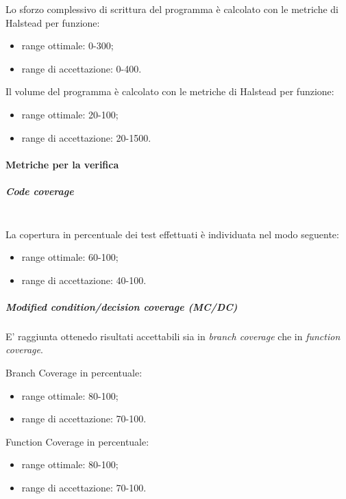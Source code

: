 Lo sforzo complessivo di scrittura del programma è calcolato con le metriche di Halstead per funzione:
\begin{itemize}
	\item range ottimale: 0-300;
	\item range di accettazione: 0-400.
\end{itemize}

Il volume del programma è calcolato con le metriche di Halstead per funzione:
\begin{itemize}
	\item range ottimale: 20-100;
	\item range di accettazione: 20-1500.
\end{itemize}

\paragraph{Metriche per la verifica}\mbox{}
\subparagraph{Code coverage}\mbox{}\\
La copertura in percentuale dei test effettuati è individuata nel modo seguente:
\begin{itemize}
	\item range ottimale: 60-100;
	\item range di accettazione: 40-100.
\end{itemize}

\subparagraph{Modified condition/decision coverage (MC/DC)}
E' raggiunta ottenedo risultati accettabili sia in \textit{branch coverage} che in \textit{function coverage}.

Branch Coverage in percentuale:
\begin{itemize}
	\item range ottimale: 80-100;
	\item range di accettazione: 70-100.
\end{itemize}

Function Coverage in percentuale:
\begin{itemize}
	\item range ottimale: 80-100;
	\item range di accettazione: 70-100.
\end{itemize}

